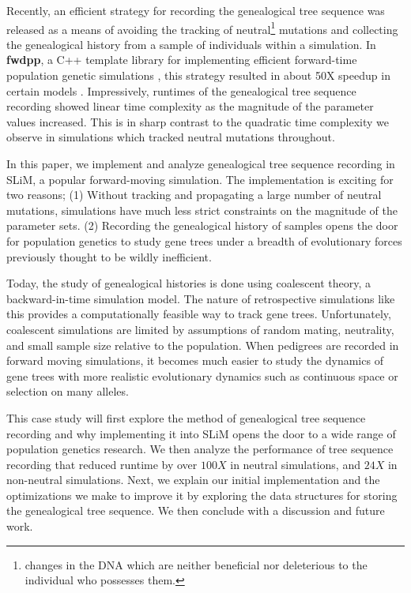 \documentclass{article}
\begin{document}
Recently, an efficient strategy for recording the genealogical tree sequence was released as a means of avoiding the tracking of 
neutral\footnote{changes in the DNA which are neither beneficial nor deleterious to the individual who possesses them.} 
mutations and collecting the genealogical history from a sample of individuals within a simulation. 
In \textbf{fwdpp}, a C++ template library for implementing efficient forward-time population genetic simulations \cite{Thornton2014}, this strategy resulted in about 50X speedup in certain models \cite{Ralph2018}. 
Impressively, runtimes of the genealogical tree sequence recording showed linear time complexity as the magnitude of the parameter values increased.
This is in sharp contrast to the quadratic time complexity we observe in simulations which tracked neutral mutations throughout.

In this paper, we implement and analyze genealogical tree sequence recording in SLiM, a popular forward-moving simulation.
The implementation is exciting for two reasons;
(1) Without tracking and propagating a large number of neutral mutations, simulations have much less strict constraints 
on the magnitude of the parameter sets.
(2) Recording the genealogical history of samples opens the door for population genetics to study gene trees under a breadth of evolutionary forces
previously thought to be wildly inefficient. 

Today, the study of genealogical histories is done using coalescent theory, a backward-in-time simulation model.
The nature of retrospective simulations like this provides a computationally feasible way to track gene trees. 
Unfortunately, coalescent simulations are limited by assumptions of random mating, neutrality, and small sample size relative to the population. 
When pedigrees are recorded in forward moving simulations,
it becomes much easier to study the dynamics of gene trees with more realistic evolutionary dynamics such as continuous space or selection on many alleles.

This case study will first explore the method of genealogical tree sequence recording 
and why implementing it into SLiM opens the door to a wide range of population genetics research.
We then analyze the performance of tree sequence recording that reduced runtime by over $100X$ in neutral simulations, and $24X$ in non-neutral simulations.
Next, we explain our initial implementation and the optimizations we make to improve it by
exploring the data structures for storing the genealogical tree sequence.
We then conclude with a discussion and future work.
\end{document}

